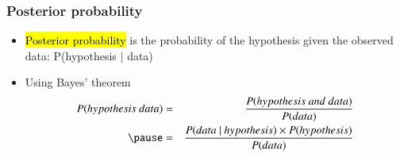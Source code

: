 \documentclass[slidestop,compress,mathserif,12pt,t,professionalfonts,xcolor=table]{beamer}
\begin{document}

\begin{frame}
\frametitle{Posterior probability}

\begin{itemize}

\item \hl{Posterior probability} is the probability of the hypothesis given the observed data: P(hypothesis $|$ data)

\pause

\item Using Bayes' theorem
\begin{eqnarray*}
P(hypothesis~data) &=& \frac{P(hypothesis~and~data)}{P(data)} \\
\pause
&=& \frac{P(data~|~hypothesis) \times P(hypothesis)}{P(data)}
\end{eqnarray*}

\end{itemize}

\end{frame}

\end{document}

